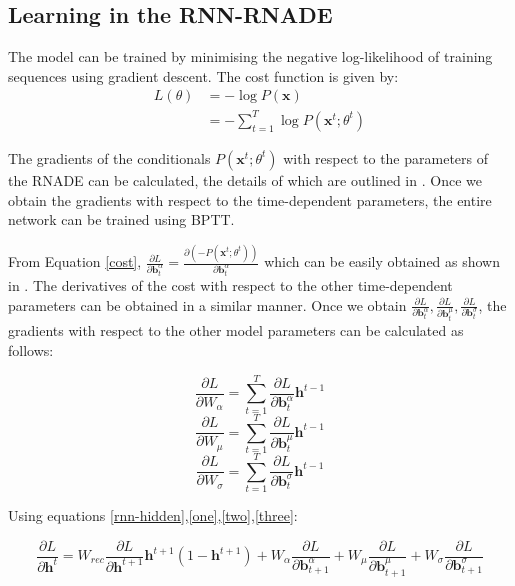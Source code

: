 \documentclass{article} %
\begin{document}
\subsection{Learning in the RNN-RNADE}

The model can be trained by minimising the negative log-likelihood of training sequences using gradient descent. The cost function is given by:
\begin{align}
L(\theta) &= - \log P(\mathbf{x}) \nonumber\\ 
&= -\sum_{t=1}^{T} \log P(\mathbf{x}^t;\theta^t) \label{cost}
\end{align}

The gradients of the conditionals $P(\mathbf{x}^t;\theta^t)$ with respect to the parameters of the RNADE can be calculated, the details of which are outlined in \cite{Uria2013}. Once we obtain the gradients with respect to the time-dependent parameters, the entire network can be trained using BPTT. 

From Equation \ref{cost}, $\frac{\partial L}{\partial \mathbf{b}^{\alpha}_{t}} = \frac{\partial (-P(\mathbf{x}^t;\theta^t))}{\partial \mathbf{b}^{\alpha}_{t}}$ which can be easily obtained as shown in \cite{Uria2013}. The derivatives of the cost with respect to the other time-dependent parameters can be obtained in a similar manner. Once we obtain $ \frac{\partial L}{\partial \mathbf{b}^{\alpha}_{t}}, \frac{\partial L}{\partial \mathbf{b}^{\mu}_{t}}, \frac{\partial L}{\partial \mathbf{b}^{\sigma}_{t}}$, the gradients with respect to the other model parameters can be calculated as follows:

\begin{equation}
\frac{\partial L}{\partial W_{\alpha}} = \sum_{t=1}^T \frac{\partial L}{\partial \mathbf{b}^{\alpha}_{t}} \mathbf{h}^{t-1}
\end{equation}
\begin{equation}
\frac{\partial L}{\partial W_{\mu}} = \sum_{t=1}^T \frac{\partial L}{\partial \mathbf{b}^{\mu}_{t}} \mathbf{h}^{t-1}
\end{equation}
\begin{equation}
\frac{\partial L}{\partial W_{\sigma}} = \sum_{t=1}^T \frac{\partial L}{\partial \mathbf{b}^{\sigma}_{t}} \mathbf{h}^{t-1}
\end{equation}

Using equations \ref{rnn-hidden},\ref{one},\ref{two},\ref{three}:

\begin{equation}
\label{grad-hidden}
\frac{\partial L}{\partial \mathbf{h}^t} = W_{rec}\frac{\partial L}{\partial \mathbf{h}^{t+1}} \mathbf{h}^{t+1} (1 - \mathbf{h}^{t+1}) + W_{\alpha} \frac{\partial L}{\partial \mathbf{b}^{\alpha}_{t+1}} + W_{\mu} \frac{\partial L}{\partial \mathbf{b}^{\mu}_{t+1}} + W_{\sigma} \frac{\partial L}{\partial \mathbf{b}^{\sigma}_{t+1}}
\end{equation}
\end{document}
